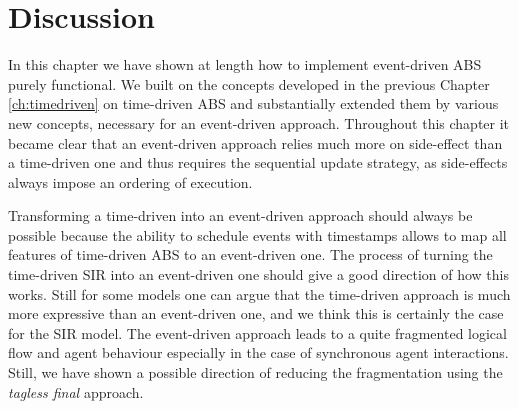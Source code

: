 \section{Discussion}
In this chapter we have shown at length how to implement event-driven ABS purely functional. We built on the concepts developed in the previous Chapter \ref{ch:timedriven} on time-driven ABS and substantially extended them by various new concepts, necessary for an event-driven approach. Throughout this chapter it became clear that an event-driven approach relies much more on side-effect than a time-driven one and thus requires the sequential update strategy, as side-effects always impose an ordering of execution.

Transforming a time-driven into an event-driven approach should always be possible because the ability to schedule events with timestamps allows to map all features of time-driven ABS to an event-driven one. The process of turning the time-driven SIR into an event-driven one should give a good direction of how this works. Still for some models one can argue that the time-driven approach is much more expressive than an event-driven one, and we think this is certainly the case for the SIR model. The event-driven approach leads to a quite fragmented logical flow and agent behaviour especially in the case of synchronous agent interactions. Still, we have shown a possible direction of reducing the fragmentation using the \textit{tagless final} approach.

